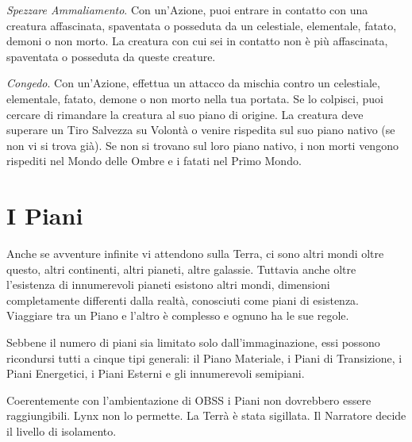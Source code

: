 \documentclass[a4paper,twoside,openany]{book}
\begin{document}
\begin{multicols}{2}
\emph{Spezzare Ammaliamento}. Con un'Azione, puoi entrare in contatto con una creatura affascinata, spaventata o posseduta da un celestiale, elementale, fatato, demoni o non morto. La creatura con cui sei in contatto non è più affascinata, spaventata o posseduta da queste creature.

\emph{Congedo}. Con un'Azione, effettua un attacco da mischia contro un celestiale, elementale, fatato, demone o non morto nella tua portata. Se lo colpisci, puoi cercare di rimandare la creatura al suo piano di origine. La creatura deve superare un Tiro Salvezza su Volontà o venire rispedita sul suo piano nativo (se non vi si trova già). Se non si trovano sul loro piano nativo, i non morti vengono rispediti nel Mondo delle Ombre e i fatati nel Primo Mondo.

\end{multicols}

\pagebreak

\section{I Piani}\label{ipiani}

Anche se avventure infinite vi attendono sulla Terra, ci sono altri mondi oltre questo, altri continenti, altri pianeti, altre galassie. Tuttavia anche oltre l'esistenza di innumerevoli pianeti esistono altri mondi, dimensioni completamente differenti dalla realtà, conosciuti come piani di esistenza. Viaggiare tra un Piano e l'altro è complesso e ognuno ha le sue regole.

Sebbene il numero di piani sia limitato solo dall'immaginazione, essi possono ricondursi tutti a cinque tipi generali: il Piano Materiale, i Piani di Transizione, i Piani Energetici, i Piani Esterni e gli innumerevoli semipiani.

\begin{changemargin}{0.3cm}{0.3cm}\begin{narratore} %
		Coerentemente con l'ambientazione di OBSS i Piani non dovrebbero essere raggiungibili. Lynx non lo permette. La Terrà è stata sigillata. Il Narratore decide il livello di isolamento.
\end{narratore}\end{changemargin}
\end{document}
